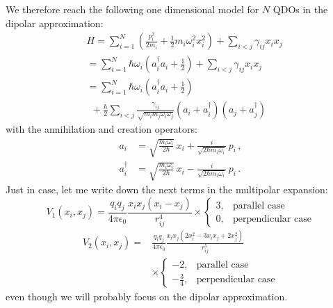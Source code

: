 \documentclass[reprint, amsmath, amssymb, aps]{revtex4-2}
\begin{document}
        We therefore reach the following one dimensional model for $N$ QDOs in the dipolar approximation:
        \begin{equation}
            \begin{split}
                &H = \sum_{i=1}^N\left(\frac{p_i^2}{2m_i}+\frac{1}{2}m_i\omega_i^2 x_i^2\right) + \sum_{i<j}\gamma_{ij}x_ix_j\\
                &= \sum_{i=1}^N\hbar\omega_i\left(a_i^\dagger a_i+\frac{1}{2}\right) + \sum_{i<j}\gamma_{ij}x_ix_j\\
                &= \sum_{i=1}^N\hbar\omega_i\left(a_i^\dagger a_i+\frac{1}{2}\right) \\
                &\ \ +\frac{\hbar}{2}\sum_{i<j}\frac{\gamma_{ij}}{\sqrt{m_im_j\omega_i\omega_j}}\left(a_i+a_i^\dagger\right)\left(a_j+a_j^\dagger\right)
            \end{split}
        \end{equation}
        with the annihilation and creation operators:
        \begin{equation}
            \begin{split}
                a_i &= \sqrt{\frac{m_i\omega_i}{2\hbar}}\,x_i+\frac{i}{\sqrt{2\hbar m_i\omega_i}}\,p_i\,,\\
                a_i^\dagger &= \sqrt{\frac{m_i\omega_i}{2\hbar}}\,x_i-\frac{i}{\sqrt{2\hbar m_i\omega_i}}\,p_i\,.
            \end{split}
        \end{equation}
        Just in case, let me write down the next terms in the multipolar expansion:
        \begin{equation}
            V_1(x_i, x_j) = \frac{q_iq_j}{4\pi\epsilon_0}\frac{x_ix_j(x_i-x_j)}{r_{ij}^4}\times
            \begin{cases}
                3, & \text{parallel case} \\
                0, & \text{perpendicular case}
            \end{cases}
        \end{equation}
        \begin{equation}
            \begin{split}
                V_2(x_i, x_j) = &\frac{q_iq_j}{4\pi\epsilon_0}\frac{x_ix_j(2x_i^2-3x_ix_j+2x_j^2)}{r_{ij}^5}\\
                &\times
                \begin{cases}
                    -2, & \text{parallel case} \\
                -\frac{3}{4}, & \text{perpendicular case}
                \end{cases}
            \end{split}
        \end{equation}
        even though we will probably focus on the dipolar approximation.
\end{document}
